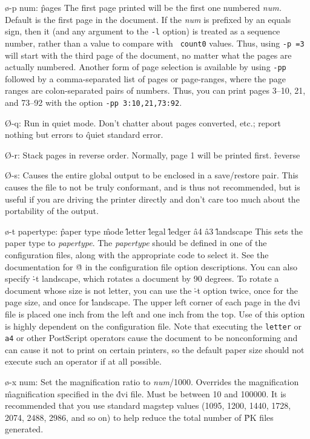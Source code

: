 {\o-p num:
\^{pages}
The first page printed will be the first one numbered {\it num.}
Default is the first page in the document.  If the {\it num} is
prefixed by an equals sign, then it (and any argument to the {\tt -l}
option) is treated as a sequence number, rather than a value to
compare with {\tt {} count0} values.  Thus, using {\tt -p =3}
will start with the third page of the document, no matter what the
pages are actually numbered.  Another form of page selection is
available by using {\tt -pp} followed by a comma-separated list of
pages or page-ranges, where the page ranges are colon-separated pairs
of numbers.  Thus, you can print pages 3--10, 21, and 73--92 with the
option {\tt -pp 3:10,21,73:92}.

\O-q: Run in quiet mode.
Don't chatter about pages converted, etc.; report nothing but errors to
\^{quiet}
standard error.

\O-r:
Stack pages in reverse order.  Normally, page 1 will be printed first.
\^{reverse}

\O-s:
Causes the entire global output to be enclosed in a save/restore pair.
This causes the file to not be truly conformant, and is thus not recommended,
but is useful if you are driving the printer directly and don't care too
much about the portability of the output.

\o-t papertype:
\^{paper type}
\^{mode}
\^{letter}
\^{legal}
\^{ledger}
\^{a4}
\^{a3}
\^{landscape}
This sets the paper type to {\it papertype}.  The {\it papertype} should
be defined in one of the configuration files, along with the appropriate
code to select it.  See the documentation for \.@ in the configuration
file option descriptions.  You can also specify
\.{-t landscape}, which rotates a document by 90 degrees.
To rotate a document whose size is not letter, you can use the 
\.{-t} option twice, once for the page size, and once for \.{landscape}.
The upper left corner of each page in
the \.{dvi} file is placed one inch from the left and one inch from the top.
Use of this option is highly dependent on the configuration file.
Note that executing the {\tt letter} or {\tt a4} or other PostScript
operators cause the document to be nonconforming and can cause it not
to print on certain printers, so the default paper size should not
execute such an operator if at all possible.

\o-x num:
Set the magnification ratio to {\it num}/1000. Overrides the magnification
\^{magnification}
specified in the \.{dvi} file.  Must be between 10 and 100000.  It is
recommended that you use standard magstep values (1095, 1200, 1440, 1728,
2074, 2488, 2986, and so on) to help reduce the total number of \.{PK}
files generated.

}
